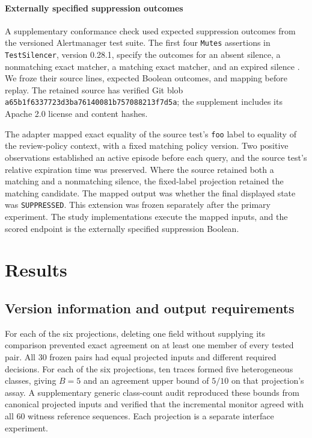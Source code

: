 \documentclass[preprint,11pt]{elsarticle}
\newcommand{\code}[1]{\texttt{#1}}
\begin{document}
\paragraph{Externally specified suppression outcomes}
A supplementary conformance check used expected suppression outcomes from the versioned Alertmanager test suite. The first four \code{Mutes} assertions in \code{TestSilencer}, version 0.28.1, specify the outcomes for an absent silence, a nonmatching exact matcher, a matching exact matcher, and an expired silence \cite{prometheusSilencer0281}. We froze their source lines, expected Boolean outcomes, and mapping before replay. The retained source has verified Git blob \code{a65b1f6337723d3ba76140081b757088213f7d5a}; the supplement includes its Apache 2.0 license and content hashes.

The adapter mapped exact equality of the source test's \code{foo} label to equality of the review-policy context, with a fixed matching policy version. Two positive observations established an active episode before each query, and the source test's relative expiration time was preserved. Where the source retained both a matching and a nonmatching silence, the fixed-label projection retained the matching candidate. The mapped output was whether the final displayed state was \code{SUPPRESSED}. This extension was frozen separately after the primary experiment.
The study implementations execute the mapped inputs, and the scored endpoint is the externally specified suppression Boolean.

\section{Results}
\subsection{Version information and output requirements}
For each of the six projections, deleting one field without supplying its comparison prevented exact agreement on at least one member of every tested pair. All 30 frozen pairs had equal projected inputs and different required decisions. For each of the six projections, ten traces formed five heterogeneous classes, giving $B=5$ and an agreement upper bound of $5/10$ on that projection's assay. A supplementary generic class-count audit reproduced these bounds from canonical projected inputs and verified that the incremental monitor agreed with all 60 witness reference sequences. Each projection is a separate interface experiment.
\end{document}
